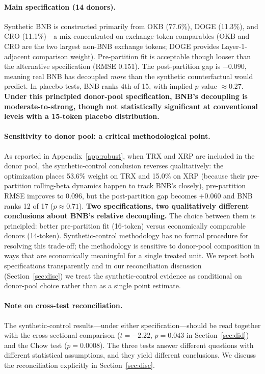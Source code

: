 \documentclass[11pt,a4paper]{article}
\begin{document}
\paragraph{Main specification (14 donors).} Synthetic BNB is constructed primarily from OKB (77.6\%), DOGE (11.3\%), and CRO (11.1\%)---a mix concentrated on exchange-token comparables (OKB and CRO are the two largest non-BNB exchange tokens; DOGE provides Layer-1-adjacent comparison weight). Pre-partition fit is acceptable though looser than the alternative specification (RMSE 0.151). The post-partition gap is $-0.090$, meaning real BNB has decoupled \emph{more} than the synthetic counterfactual would predict. In placebo tests, BNB ranks 4th of 15, with implied $p$-value $\approx 0.27$. \textbf{Under this principled donor-pool specification, BNB's decoupling is moderate-to-strong, though not statistically significant at conventional levels with a 15-token placebo distribution.}

\paragraph{Sensitivity to donor pool: a critical methodological point.} As reported in Appendix~\ref{app:robust}, when TRX and XRP are included in the donor pool, the synthetic-control conclusion reverses qualitatively: the optimization places 53.6\% weight on TRX and 15.0\% on XRP (because their pre-partition rolling-beta dynamics happen to track BNB's closely), pre-partition RMSE improves to 0.096, but the post-partition gap becomes $+0.060$ and BNB ranks 12 of 17 ($p \approx 0.71$). \textbf{Two specifications, two qualitatively different conclusions about BNB's relative decoupling.} The choice between them is principled: better pre-partition fit (16-token) versus economically comparable donors (14-token). Synthetic-control methodology has no formal procedure for resolving this trade-off; the methodology is sensitive to donor-pool composition in ways that are economically meaningful for a single treated unit. We report both specifications transparently and in our reconciliation discussion (Section~\ref{sec:disc}) we treat the synthetic-control evidence as conditional on donor-pool choice rather than as a single point estimate.

\paragraph{Note on cross-test reconciliation.} The synthetic-control results---under either specification---should be read together with the cross-sectional comparison ($t = -2.22$, $p = 0.043$ in Section~\ref{sec:did}) and the Chow test ($p = 0.0008$). The three tests answer different questions with different statistical assumptions, and they yield different conclusions. We discuss the reconciliation explicitly in Section~\ref{sec:disc}.
\end{document}

